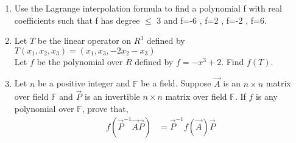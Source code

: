 \renewcommand{\theequation}{\theenumi}
\renewcommand{\thefigure}{\theenumi}
\begin{enumerate}[label=\thesubsection.\arabic*.,ref=\thesubsection.\theenumi]

\item Use the Lagrange interpolation formula to find a polynomial f with real coefficients such that f has degree $\leq$ 3 and f=-6 , f=2 , f=-2 , f=6.
%
\\
\solution

\item Let $T$ be the linear operator on $R^3$ defined by\\
$T(x_1,x_2,x_3)=(x_1,x_3,-2x_2-x_3)$\\
Let $f$ be the polynomial over $R$ defined by $f=-x^3+2$. Find $f(T)$.
%
\\
\solution

\item Let $n$ be a positive integer and $\mathbb{F}$ be a field. Suppose $\vec{A}$ is an $n \times n$ matrix over field $\mathbb{F}$ and $\vec{P}$ is an invertible $n \times n$ matrix over field $\mathbb{F}$. If $f$ is any polynomial over $\mathbb{F}$, prove
that,
\begin{align}
f(\vec{P}^{-1}\vec{A}\vec{P}) &= \vec{P}^{-1}f(\vec{A})\vec{P}
\end{align}
%
\\
\solution

\end{enumerate}
